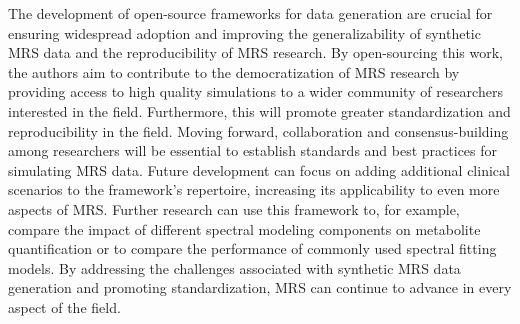The development of open-source frameworks for data generation are crucial for ensuring widespread adoption and improving the generalizability of synthetic MRS data and the reproducibility of MRS research. By open-sourcing this work, the authors aim to contribute to the democratization of MRS research by providing access to high quality simulations to a wider community of researchers interested in the field. Furthermore, this will promote greater standardization and reproducibility in the field. Moving forward, collaboration and consensus-building among researchers will be essential to establish standards and best practices for simulating MRS data. Future development can focus on adding additional clinical scenarios to the framework's repertoire, increasing its applicability to even more aspects of MRS. Further research can use this framework to, for example, compare the impact of different spectral modeling components on metabolite quantification or to compare the performance of commonly used spectral fitting models. By addressing the challenges associated with synthetic MRS data generation and promoting standardization, MRS can continue to advance in every aspect of the field. 



